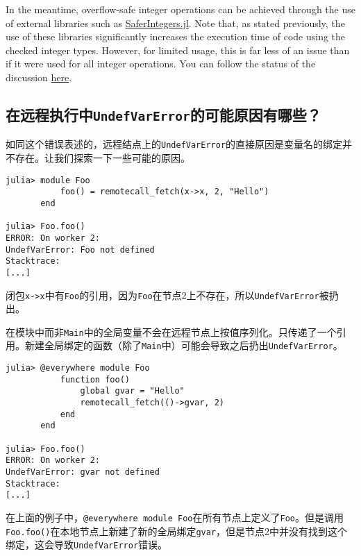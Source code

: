 In the meantime, overflow-safe integer operations can be achieved through the use of external libraries such as \href{https://github.com/JeffreySarnoff/SaferIntegers.jl}{SaferIntegers.jl}. Note that, as stated previously, the use of these libraries significantly increases the execution time of code using the checked integer types. However, for limited usage, this is far less of an issue than if it were used for all integer operations. You can follow the status of the discussion \href{https://github.com/JuliaLang/julia/issues/855}{here}.



\hypertarget{15127813284498705272}{}


\subsection{在远程执行中\texttt{UndefVarError}的可能原因有哪些？}



如同这个错误表述的，远程结点上的\texttt{UndefVarError}的直接原因是变量名的绑定并不存在。让我们探索一下一些可能的原因。




\begin{verbatim}
julia> module Foo
           foo() = remotecall_fetch(x->x, 2, "Hello")
       end

julia> Foo.foo()
ERROR: On worker 2:
UndefVarError: Foo not defined
Stacktrace:
[...]
\end{verbatim}



闭包\texttt{x->x}中有\texttt{Foo}的引用，因为\texttt{Foo}在节点2上不存在，所以\texttt{UndefVarError}被扔出。



在模块中而非\texttt{Main}中的全局变量不会在远程节点上按值序列化。只传递了一个引用。新建全局绑定的函数（除了\texttt{Main}中）可能会导致之后扔出\texttt{UndefVarError}。




\begin{verbatim}
julia> @everywhere module Foo
           function foo()
               global gvar = "Hello"
               remotecall_fetch(()->gvar, 2)
           end
       end

julia> Foo.foo()
ERROR: On worker 2:
UndefVarError: gvar not defined
Stacktrace:
[...]
\end{verbatim}



在上面的例子中，\texttt{@everywhere module Foo}在所有节点上定义了\texttt{Foo}。但是调用\texttt{Foo.foo()}在本地节点上新建了新的全局绑定\texttt{gvar}，但是节点2中并没有找到这个绑定，这会导致\texttt{UndefVarError}错误。



